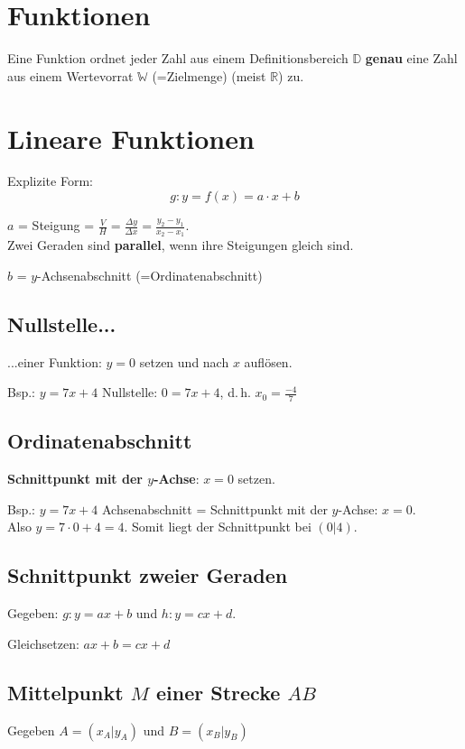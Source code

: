 \begin{multicols}{2}
\section*{Funktionen}

Eine Funktion ordnet jeder Zahl aus einem Definitionsbereich
$\mathbb{D}$ \textbf{genau} eine Zahl aus einem Wertevorrat
$\mathbb{W}$ (=Zielmenge) (meist $\mathbb{R}$) zu.

\hrulefill
\section*{Lineare Funktionen}
Explizite Form:
$$g: y = f(x) = a\cdot{}x + b$$

$a$ = Steigung = $\frac{V}{H}=\frac{\Delta y}{\Delta x} = \frac{y_2-y_1}{x_2-x_1}$.\\
Zwei Geraden sind \textbf{parallel}, wenn ihre Steigungen gleich sind.

$b$ = $y$-Achsenabschnitt (=Ordinatenabschnitt)


\subsection*{Nullstelle...} ...einer Funktion: $y=0$ setzen und nach $x$
auf\/lösen.

Bsp.: $y=7x+4$ Nullstelle: $0 = 7x+4$, d.\,h. $x_0=\frac{-4}{7}$

\subsection*{Ordinatenabschnitt}
\textbf{Schnittpunkt mit der $y$-Achse}: $x=0$ setzen.

Bsp.: $y=7x+4$ Achsenabschnitt = Schnittpunkt mit der $y$-Achse:
$x=0$.\\
Also $y=7\cdot{}0 + 4 = 4$. Somit liegt der Schnittpunkt bei $(0|4)$.


\subsection*{Schnittpunkt zweier Geraden}
Gegeben: $g: y=ax+b$ und $h: y=cx+d$.

Gleichsetzen: $ax+b = cx+d$


\subsection*{Mittelpunkt $M$ einer Strecke $AB$}
Gegeben $A=(x_A|y_A)$ und $B=(x_B|y_B)$


\end{multicols}
